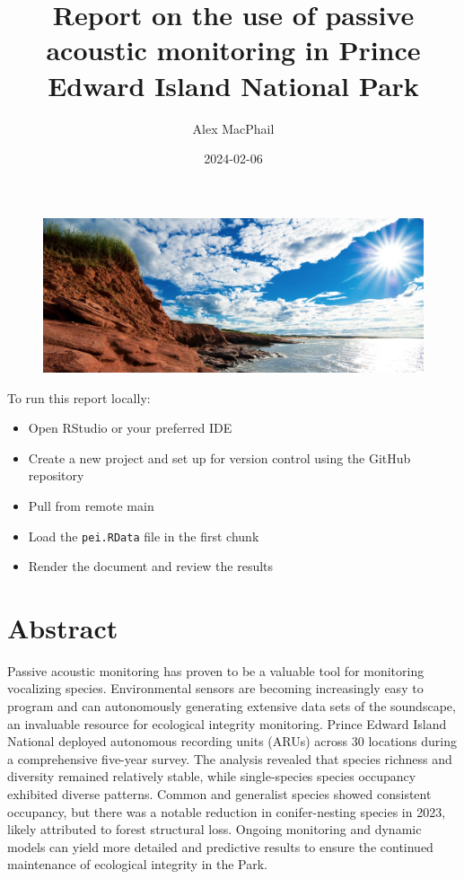 \documentclass[
  letterpaper,
  DIV=11,
  numbers=noendperiod,
  oneside]{scrartcl}
\title{Report on the use of passive acoustic monitoring in Prince Edward
Island National Park}
\author{Alex MacPhail}
\date{2024-02-06}
\providecommand{\tightlist}{%
  \setlength{\itemsep}{0pt}\setlength{\parskip}{0pt}}\usepackage{longtable,booktabs,array}
\renewcommand*\contentsname{Table of contents}
\newcommand\contentsname{Table of contents}
\begin{document}
\maketitle
\ifdefined\Shaded\renewenvironment{Shaded}{\begin{tcolorbox}[borderline west={3pt}{0pt}{shadecolor}, breakable, frame hidden, sharp corners, enhanced, boxrule=0pt, interior hidden]}{\end{tcolorbox}}\fi

\renewcommand*\contentsname{Table of contents}
{
\hypersetup{linkcolor=}
\setcounter{tocdepth}{3}
\tableofcontents
}
\begin{figure}

{\centering \includegraphics{peinpheader.png}

}

\end{figure}

To run this report locally:

\begin{itemize}
\tightlist
\item
  Open RStudio or your preferred IDE
\item
  Create a new project and set up for version control using the GitHub
  repository
\item
  Pull from remote main
\item
  Load the \texttt{pei.RData} file in the first chunk
\item
  Render the document and review the results
\end{itemize}

\hypertarget{abstract}{%
\section{Abstract}\label{abstract}}

Passive acoustic monitoring has proven to be a valuable tool for
monitoring vocalizing species. Environmental sensors are becoming
increasingly easy to program and can autonomously generating extensive
data sets of the soundscape, an invaluable resource for ecological
integrity monitoring. Prince Edward Island National deployed autonomous
recording units (ARUs) across 30 locations during a comprehensive
five-year survey. The analysis revealed that species richness and
diversity remained relatively stable, while single-species species
occupancy exhibited diverse patterns. Common and generalist species
showed consistent occupancy, but there was a notable reduction in
conifer-nesting species in 2023, likely attributed to forest structural
loss. Ongoing monitoring and dynamic models can yield more detailed and
predictive results to ensure the continued maintenance of ecological
integrity in the Park.
\end{document}
